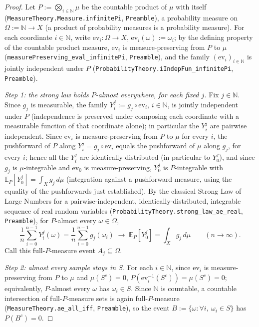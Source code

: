 \begin{proof}
  Let $P := \bigotimes_{i \in \mathbb{N}} \mu$ be the countable product of $\mu$ with itself
  (\texttt{MeasureTheory.Measure.infinitePi}, \texttt{Preamble}), a probability measure on
  $\Omega := \mathbb{N} \to X$ (a product of probability measures is a probability measure). For
  each coordinate $i \in \mathbb{N}$, write $\mathrm{ev}_i \colon \Omega \to X$,
  $\mathrm{ev}_i(\omega) := \omega_i$; by the defining property of the countable product measure,
  $\mathrm{ev}_i$ is measure-preserving from $P$ to $\mu$
  (\texttt{measurePreserving\_eval\_infinitePi}, \texttt{Preamble}), and the family
  $(\mathrm{ev}_i)_{i \in \mathbb{N}}$ is jointly independent under $P$
  (\texttt{ProbabilityTheory.iIndepFun\_infinitePi}, \texttt{Preamble}).

  \emph{Step 1: the strong law holds $P$-almost everywhere, for each fixed $j$.} Fix $j \in
  \mathbb{N}$. Since $g_j$ is measurable, the family $Y^j_i := g_j \circ \mathrm{ev}_i$,
  $i \in \mathbb{N}$, is jointly independent under $P$ (independence is preserved under composing
  each coordinate with a measurable function of that coordinate alone); in particular the $Y^j_i$
  are pairwise independent. Since $\mathrm{ev}_i$ is measure-preserving from $P$ to $\mu$ for every
  $i$, the pushforward of $P$ along $Y^j_i = g_j \circ \mathrm{ev}_i$ equals the pushforward of $\mu$
  along $g_j$, for every $i$; hence all the $Y^j_i$ are identically distributed (in particular to
  $Y^j_0$), and since $g_j$ is $\mu$-integrable and $\mathrm{ev}_0$ is measure-preserving, $Y^j_0$
  is $P$-integrable with $\mathbb{E}_P[Y^j_0] = \int_X g_j \, d\mu$ (integration against a
  pushforward measure, using the equality of the pushforwards just established). By the classical
  Strong Law of Large Numbers for a pairwise-independent, identically-distributed, integrable
  sequence of real random variables (\texttt{ProbabilityTheory.strong\_law\_ae\_real},
  \texttt{Preamble}), for $P$-almost every $\omega \in \Omega$,
  \[
    \frac{1}{n} \sum_{i=0}^{n-1} Y^j_i(\omega) = \frac{1}{n}\sum_{i=0}^{n-1} g_j(\omega_i)
    \;\longrightarrow\; \mathbb{E}_P[Y^j_0] = \int_X g_j\,d\mu
    \qquad (n \to \infty)
    .
  \]
  Call this full-$P$-measure event $A_j \subseteq \Omega$.

  \emph{Step 2: almost every sample stays in $S$.} For each $i \in \mathbb{N}$, since $\mathrm{ev}_i$
  is measure-preserving from $P$ to $\mu$ and $\mu(S^c) = 0$,
  $P(\mathrm{ev}_i^{-1}(S^c)) = \mu(S^c) = 0$; equivalently, $P$-almost every $\omega$ has
  $\omega_i \in S$. Since $\mathbb{N}$ is countable, a countable intersection of full-$P$-measure
  sets is again full-$P$-measure (\texttt{MeasureTheory.ae\_all\_iff}, \texttt{Preamble}), so the
  event $B := \{\omega : \forall i,\ \omega_i \in S\}$ has $P(B^c) = 0$.


\end{proof}
